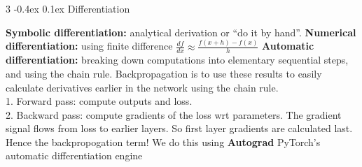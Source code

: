 \documentclass[8pt,landscape]{article}
\makeatletter
\renewcommand{\subsection}{\@startsection{subsection}{2}{0pt}%
    {-0.4ex}%
    {0.1ex}%
    {\fontsize{8}{9}\bfseries\color{blue}}}
\newcommand{\smalltext}[1]{%
  {\fontsize{8}{9}\selectfont\sloppy #1\par}%
}
\makeatother
\begin{document}
\begin{multicols}{3}
\subsection{Differentiation}
\smalltext{
\textbf{Symbolic differentiation:} analytical derivation or “do it by hand”.
\textbf{Numerical differentiation:} using finite difference $\frac{df}{dx} \approx \frac{f(x+h)-f(x)}{h}$
\textbf{Automatic differentiation:} breaking down computations into elementary sequential steps, and using the chain rule.
Backpropagation is to use these results to easily calculate derivatives earlier in the network using the chain rule. \\
1. Forward pass: compute outputs and loss.\\
2. Backward pass: compute gradients of the loss wrt parameters. 
The gradient signal flows from loss to earlier layers. So first layer gradients are calculated last. Hence the backpropogation term!
We do this using \textbf{Autograd} PyTorch's automatic differentiation engine
}

\end{multicols}
\end{document}
